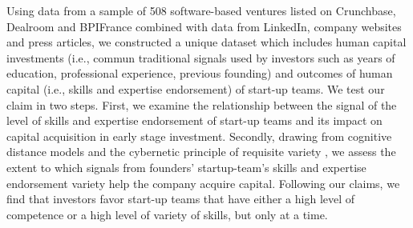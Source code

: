 \documentclass[12pt]{article}
\begin{document}
Using data from a sample of 508 software-based ventures listed on Crunchbase, Dealroom and BPIFrance combined with data from LinkedIn, company websites and press articles, we constructed a unique dataset which includes human capital investments (i.e., commun traditional signals used by investors such as years of education, professional experience, previous founding) and outcomes of human capital (i.e., skills and expertise endorsement) of start-up teams. We test our claim in two steps. First, we examine the relationship between the signal of the level of skills and expertise endorsement of start-up teams and its impact on capital acquisition in early stage investment. Secondly, drawing from cognitive distance models \citep{nooteboom2007optimal} and the cybernetic principle of requisite variety \citep{ashby1957introduction}, we assess the extent to which signals from founders’ startup-team’s skills and expertise endorsement variety help the company acquire capital. Following our claims, we find that investors favor start-up teams that have either a high level of competence or a high level of variety of skills, but only at a time.
\end{document}
